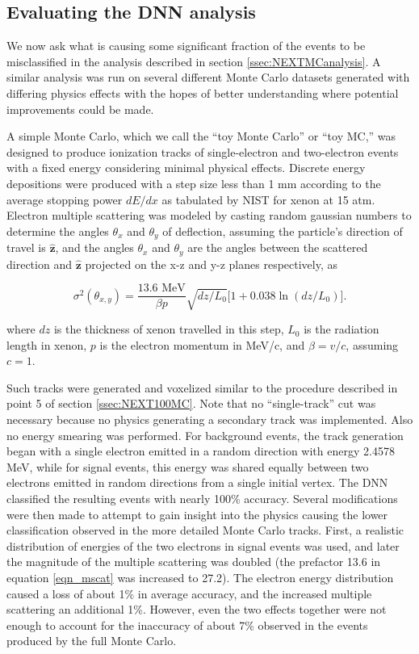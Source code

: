 \documentclass[a4paper,11pt]{article}
\begin{document}
\subsection{Evaluating the DNN analysis}\label{ssec:DNNeval}
We now ask what is causing some significant fraction of the events to be misclassified in the analysis described in section \ref{ssec:NEXTMCanalysis}.  A similar analysis was run on 
several different Monte Carlo datasets generated with differing physics effects with the hopes of better understanding where potential improvements could be made.

A simple Monte Carlo, which we call the ``toy Monte Carlo'' or ``toy MC,'' was designed to produce ionization tracks of single-electron and two-electron events with a fixed energy
considering minimal physical effects.  Discrete energy depositions were produced with a step size less than 1 mm according to the average stopping power $dE/dx$ as tabulated by
NIST \cite{NIST_mac} for xenon at 15 atm.  Electron multiple scattering was modeled by casting random gaussian numbers to determine the angles $\theta_{x}$ and $\theta_{y}$ of deflection, 
assuming the particle's direction of travel is $\hat{\mathbf{z}}$, and the angles $\theta_{x}$ and $\theta_{y}$ are the angles between the scattered direction and $\hat{\mathbf{z}}$ projected on 
the x-z and y-z planes respectively, as

\begin{equation}\label{eqn_mscat}
\sigma^{2}(\theta_{x,y}) = \frac{13.6\,\,\mathrm{MeV}}{\beta p}\sqrt{dz/L_{0}}\bigl[1 + 0.038\ln(dz/L_{0})\bigr].
\end{equation}

\noindent where $dz$ is the thickness of xenon travelled in this step, $L_{0}$ is the radiation length in xenon, $p$ is the electron momentum in MeV/c, and $\beta = v/c$, assuming $c = 1$.

Such tracks were generated and voxelized similar to the procedure described in point 5 of section \ref{ssec:NEXT100MC}.  Note that no ``single-track'' cut was necessary because no
physics generating a secondary track was implemented.  Also no energy smearing was performed.  For background events, the track generation began with a single electron emitted in a
random direction with energy 2.4578 MeV, while for signal events, this energy was shared equally between two electrons emitted in random directions from a single initial vertex.  The DNN
classified the resulting events with nearly 100\% accuracy.  Several modifications were then made to attempt to gain insight into the physics causing the lower classification observed in the
more detailed Monte Carlo tracks.  First, a realistic distribution of energies of the two electrons in signal events \cite{Ponkratenko_2000} was used, and later the magnitude of the multiple scattering was doubled (the prefactor 13.6 in equation \ref{eqn_mscat} was increased to 27.2).  The electron energy distribution caused a loss of about 1\% in average accuracy, and the
increased multiple scattering an additional 1\%.  However, even the two effects together were not enough to account for the inaccuracy of about 7\% observed in the events produced by the
full Monte Carlo.
\end{document}
